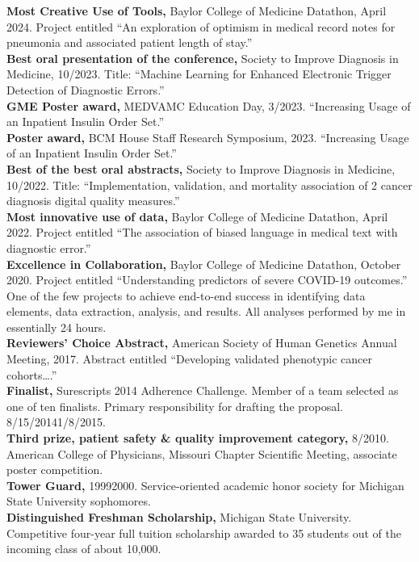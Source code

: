 \documentclass[10pt]{article}
\begin{document}
\textbf{Most Creative Use of Tools,} Baylor College of Medicine
Datathon, April 2024. Project entitled ``An exploration of optimism in
medical record notes for pneumonia and associated patient length of
stay.''\\
\textbf{Best oral presentation of the conference,} Society to Improve
Diagnosis in Medicine, 10/2023. Title: ``Machine Learning for Enhanced
Electronic Trigger Detection of Diagnostic Errors.''\\
\textbf{GME Poster award,} MEDVAMC Education Day, 3/2023.
``Increasing Usage of an Inpatient Insulin Order Set.''\\
\textbf{Poster award,} BCM House Staff Research Symposium, 2023.
``Increasing Usage of an Inpatient Insulin Order Set.''\\
\textbf{Best of the best oral abstracts,} Society to Improve Diagnosis
in Medicine, 10/2022. Title: ``Implementation, validation, and
mortality association of 2 cancer diagnosis digital quality
measures.''\\
\textbf{Most innovative use of data,} Baylor College of Medicine
Datathon, April 2022. Project entitled ``The association of biased
language in medical text with diagnostic error.''\\
\textbf{Excellence in Collaboration,} Baylor College of Medicine
Datathon, October 2020. Project entitled ``Understanding predictors of
severe COVID-19 outcomes.'' One of the few projects to achieve
end-to-end success in identifying data elements, data extraction,
analysis, and results. All analyses performed by me in essentially 24
hours.\\
\textbf{Reviewers' Choice Abstract,} American Society of Human
Genetics Annual Meeting, 2017. Abstract entitled ``Developing
validated phenotypic cancer cohorts\ldots{}.''\\
\textbf{Finalist,} Surescripts 2014 Adherence Challenge. Member of a
team selected as one of ten finalists. Primary responsibility for
drafting the proposal. 8/15/2014\ndash{}1/8/2015.\\
\textbf{Third prize, patient safety \& quality improvement category,}
8/2010. American College of Physicians, Missouri Chapter Scientific
Meeting, associate poster competition.\\
\textbf{Tower Guard,} 1999\ndash{}2000. Service-oriented academic
honor society for Michigan State University sophomores.\\
\textbf{Distinguished Freshman Scholarship,} Michigan State
University. Competitive four-year full tuition scholarship awarded to
35 students out of the incoming class of about 10,000.
\end{document}
